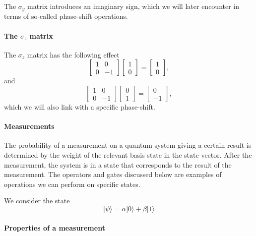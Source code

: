 The $\sigma_y$ matrix introduces an imaginary sign, which we will later encounter in terms of so-called phase-shift operations.


\paragraph{The $\sigma_z$ matrix}
The $\sigma_z$ matrix has the following effect
\[
\begin{bmatrix} 1 & 0 \\ 0 & -1 \end{bmatrix}\begin{bmatrix} 1 \\ 0 \end{bmatrix}=\begin{bmatrix} 1  \\ 0  \end{bmatrix},
\]
and 
\[
\begin{bmatrix} 1 & 0 \\ 0 & -1 \end{bmatrix}\begin{bmatrix} 0 \\ 1 \end{bmatrix}=\begin{bmatrix} 0  \\ -1  \end{bmatrix},
\]
which we will also link with a specific phase-shift.



\paragraph{Measurements}

The probability of a measurement on a quantum system giving a certain
result is determined by the weight of the relevant basis state in the
state vector. After the measurement, the system is in a state that
corresponds to the result of the measurement. The operators and
gates discussed below are examples of operations we can perform on
specific states.

We  consider the state
\[
\vert \psi\rangle = \alpha \vert 0 \rangle +\beta \vert 1 \rangle
\]


\paragraph{Properties of a measurement}

